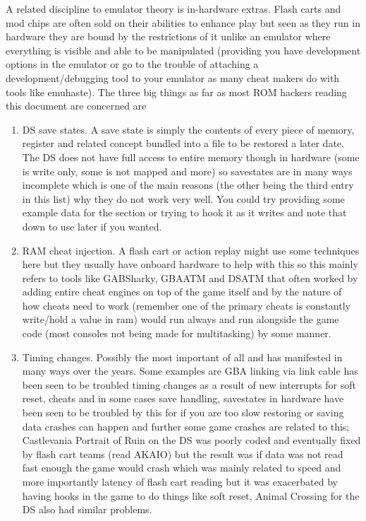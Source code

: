 \documentclass[
]{book}
\providecommand{\tightlist}{%
  \setlength{\itemsep}{0pt}\setlength{\parskip}{0pt}}
\begin{document}
A related discipline to emulator theory is in-hardware extras. Flash carts and mod chips are often sold on their abilities to enhance play but seen as they run in hardware they are bound by the restrictions of it unlike an emulator where everything is visible and able to be manipulated (providing you have development options in the emulator or go to the trouble of attaching a development/debugging tool to your emulator as many cheat makers do with tools like emuhaste). The three big things as far as most ROM hackers reading this document are concerned are

\begin{enumerate}
\def\labelenumi{\arabic{enumi}.}
\tightlist
\item
  DS save states. A save state is simply the contents of every piece of memory, register and related concept bundled into a file to be restored a later date. The DS does not have full access to entire memory though in hardware (some is write only, some is not mapped and more) so savestates are in many ways incomplete which is one of the main reasons (the other being the third entry in this list) why they do not work very well. You could try providing some example data for the section or trying to hook it as it writes and note that down to use later if you wanted.
\item
  RAM cheat injection. A flash cart or action replay might use some techniques here but they usually have onboard hardware to help with this so this mainly refers to tools like GABSharky, GBAATM and DSATM that often worked by adding entire cheat engines on top of the game itself and by the nature of how cheats need to work (remember one of the primary cheats is constantly write/hold a value in ram) would run always and run alongside the game code (most consoles not being made for multitasking) by some manner.
\item
  Timing changes. Possibly the most important of all and has manifested in many ways over the years. Some examples are GBA linking via link cable has been seen to be troubled timing changes as a result of new interrupts for soft reset, cheats and in some cases save handling, savestates in hardware have been seen to be troubled by this for if you are too slow restoring or saving data crashes can happen and further some game crashes are related to this; Castlevania Portrait of Ruin on the DS was poorly coded and eventually fixed by flash cart teams (read AKAIO) but the result was if data was not read fast enough the game would crash which was mainly related to speed and more importantly latency of flash cart reading but it was exacerbated by having hooks in the game to do things like soft reset, Animal Crossing for the DS also had similar problems.
\end{enumerate}
\end{document}
